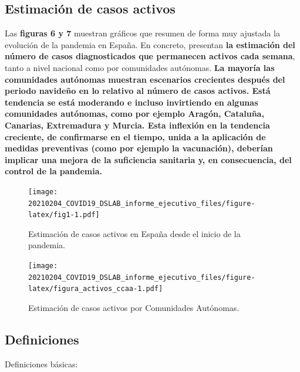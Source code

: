 \documentclass[
  11pt,
]{article}
\begin{document}
\clearpage

\setcounter{page}{9}

\hypertarget{estimaciuxf3n-de-casos-activos}{%
\subsection{Estimación de casos
activos}\label{estimaciuxf3n-de-casos-activos}}

Las \textbf{figuras 6 y 7} muestran gráficos que resumen de forma muy
ajustada la evolución de la pandemia en España. En concreto, presentan
\textbf{la estimación del número de casos diagnosticados que permanecen
activos cada semana}, tanto a nivel nacional como por comunidades
autónomas. \textbf{La mayoría las comunidades autónomas muestran
escenarios crecientes después del periodo navideño en lo relativo al
número de casos activos. Está tendencia se está moderando e incluso
invirtiendo en algunas comunidades autónomas, como por ejemplo Aragón,
Cataluña, Canarias, Extremadura y Murcia. Esta inflexión en la tendencia
creciente, de confirmarse en el tiempo, unida a la aplicación de medidas
preventivas (como por ejemplo la vacunación), deberían implicar una
mejora de la suficiencia sanitaria y, en consecuencia, del control de la
pandemia.}

\vspace{0.2cm}

\begin{figure}
\centering
\texttt{[image: 20210204\_COVID19\_DSLAB\_informe\_ejecutivo\_files/figure-latex/fig1-1.pdf]}
\caption{\label{fig:fig17a_res} Estimación de casos activos en España
desde el inicio de la pandemia.}
\end{figure}

\begin{figure}
\centering
\texttt{[image: 20210204\_COVID19\_DSLAB\_informe\_ejecutivo\_files/figure-latex/figura\_activos\_ccaa-1.pdf]}
\caption{\label{fig:figura_activos_ccaa} Estimación de casos activos por
Comunidades Autónomas.}
\end{figure}

\newpage
\setcounter{page}{11}

\hypertarget{definiciones}{%
\subsection{Definiciones}\label{definiciones}}

Definiciones básicas:
\end{document}
